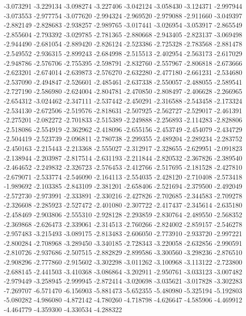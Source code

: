 -3.073291
-3.229134
-3.098274
-3.227406
-3.042124
-3.058430
-3.124371
-2.997944
-3.073553
-2.977754
-3.077620
-2.994324
-2.969520
-2.979088
-2.911660
-3.049397
-2.882149
-2.828683
-2.938257
-2.989765
-3.017441
-3.026954
-3.053917
-2.865549
-2.855604
-2.793392
-3.029785
-2.781365
-2.880668
-2.943405
-2.823137
-3.069498
-2.944490
-2.681054
-2.889420
-2.826124
-2.523386
-2.725328
-2.783568
-2.881478
-2.549552
-2.936315
-2.899243
-2.684998
-2.515513
-2.402954
-2.563173
-2.617029
-2.948786
-2.576706
-2.755395
-2.598791
-2.832760
-2.557967
-2.806818
-2.673666
-2.623201
-2.674014
-2.639873
-2.576270
-2.632280
-2.477180
-2.661231
-2.534680
-2.537090
-2.494847
-2.526601
-2.485461
-2.637338
-2.550057
-2.488055
-2.589541
-2.727190
-2.586980
-2.624004
-2.804781
-2.470850
-2.808497
-2.406628
-2.266965
-2.654312
-3.024462
-2.347111
-2.537442
-2.450291
-2.316588
-2.543458
-2.173324
-2.534130
-2.672506
-2.519576
-2.818631
-2.507925
-2.562727
-2.529017
-2.461391
-2.275201
-2.082272
-2.701833
-2.515389
-2.249888
-2.256893
-2.114283
-2.828806
-2.518086
-2.554919
-2.362962
-2.418096
-2.655156
-2.453749
-2.454079
-2.434729
-2.504419
-2.523739
-2.096811
-2.780738
-2.299355
-2.489204
-2.289234
-2.283752
-2.450163
-2.215443
-2.213368
-2.555027
-2.312917
-2.328655
-2.629951
-2.091823
-2.138944
-2.203987
-2.817514
-2.631193
-2.211844
-2.820532
-2.367826
-2.389540
-2.464652
-2.249832
-2.326723
-2.576453
-2.412766
-2.517695
-2.181528
-2.427810
-2.679071
-2.533774
-2.546090
-2.164113
-2.554035
-2.428120
-2.710408
-2.573418
-1.989692
-2.103385
-2.843109
-2.381201
-2.658406
-2.521694
-2.379500
-2.492049
-2.572730
-2.973991
-2.333891
-2.330216
-2.427826
-2.702685
-2.344583
-2.709278
-2.326608
-2.285923
-2.527472
-2.401080
-2.307722
-2.417437
-2.345614
-2.635180
-2.458469
-2.903806
-2.555310
-2.928128
-2.293859
-2.830764
-2.489550
-2.568352
-2.369868
-2.626473
-2.339061
-2.314513
-2.760266
-2.824002
-2.859157
-2.546278
-2.957483
-3.215493
-3.089175
-2.813483
-2.606050
-2.773910
-2.933720
-2.997221
-2.800284
-2.708968
-3.289450
-3.340185
-2.728343
-3.220058
-2.632856
-2.990591
-2.810726
-2.937686
-2.507515
-2.882829
-2.899586
-3.300560
-3.298236
-2.876510
-2.908296
-2.777860
-2.915602
-3.302298
-3.011262
-3.100968
-3.113122
-2.723800
-2.688145
-2.441503
-3.410368
-3.086864
-3.202911
-2.950761
-3.033123
-3.007482
-2.979449
-3.258945
-2.999945
-2.872414
-3.020698
-3.035621
-3.017828
-3.302283
-7.269707
-6.571470
-6.156903
-5.881473
-5.652355
-5.480980
-5.325194
-5.192803
-5.080282
-4.986080
-4.872142
-4.780260
-4.718798
-4.626647
-4.585906
-4.469912
-4.464779
-4.359300
-4.330534
-4.288322
